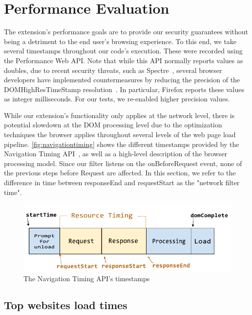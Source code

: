 \section{Performance Evaluation} \label{performance}
The extension's performance goals are to provide our security guarantees without being a detriment to the end user's browsing experience. To this end, we take several timestamps throughout our code's execution. These were recorded using the Performance Web API. Note that while this API normally reports values as doubles, due to recent security threats, such as Spectre~\cite{DBLP:journals/corr/abs-1801-01203}, several browser developers have implemented countermeasures by reducing the precision of the DOMHighResTimeStamp resolution~\cite{reducetimeprecision,resolutionconsiderations}. In particular, Firefox reports these values as integer milliseconds. For our tests, we re-enabled higher precision values.

While our extension's functionality only applies at the network level, there is potential slowdown at the DOM processing level due to the optimization techniques the browser applies throughout several levels of the web page load pipeline. \autoref{fig:navigationtiming} shows the different timestamps provided by the Navigation Timing API~\cite{navigationtiming}, as well as a high-level description of the browser processing model. Since our filter listens on the onBeforeRequest event, none of the previous steps before Request are affected. In this section, we refer to the difference in time between responseEnd and requestStart as the "network filter time".

\begin{figure}[h]
	\begin{center}
 \includegraphics[scale=0.65]{img/timestamp-diagram-edited.pdf}
 \end{center}
 \caption{The Navigation Timing API's timestamps\protect\footnotemark}
 \label{fig:navigationtiming}
 \end{figure}


\subsection{Top websites load times} \label{top_sites}

